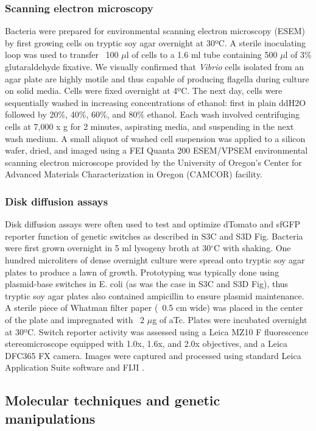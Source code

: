 \subsubsection{Scanning electron microscopy} 
Bacteria were prepared for environmental scanning electron microscopy (ESEM) by first growing cells on tryptic soy agar overnight at 30ºC. A sterile inoculating loop was used to transfer ~100 $\mu$l of cells to a 1.6 ml tube containing 500 $\mu$l of 3\% glutaraldehyde fixative. We visually confirmed that \textit{Vibrio} cells isolated from an agar plate are highly motile and thus capable of producing flagella during culture on solid media. Cells were fixed overnight at 4ºC. The next day, cells were sequentially washed in increasing concentrations of ethanol: first in plain ddH2O followed by 20\%, 40\%, 60\%, and 80\% ethanol. Each wash involved centrifuging cells at 7,000 x g for 2 minutes, aspirating media, and suspending in the next wash medium. A small aliquot of washed cell suspension was applied to a silicon wafer, dried, and imaged using a FEI Quanta 200 ESEM/VPSEM environmental scanning electron microscope provided by the University of Oregon's Center for Advanced Materials Characterization in Oregon (CAMCOR) facility. 

\subsubsection{Disk diffusion assays}
Disk diffusion assays were often used to test and optimize dTomato and sfGFP reporter function of genetic switches as described in S3C and S3D Fig. Bacteria were first grown overnight in 5 ml lysogeny broth at 30$^\circ$C with shaking. One hundred microliters of dense overnight culture were spread onto tryptic soy agar plates to produce a lawn of growth. Prototyping was typically done using plasmid-base switches in E. coli (as was the case in S3C and S3D Fig), thus tryptic soy agar plates also contained ampicillin to ensure plasmid maintenance. A sterile piece of Whatman filter paper (~0.5 cm wide) was placed in the center of the plate and impregnated with ~2 $\mu$g of aTc. Plates were incubated overnight at 30ºC. Switch reporter activity was assessed using a Leica MZ10 F fluorescence stereomicroscope equipped with 1.0x, 1.6x, and 2.0x objectives, and a Leica DFC365 FX camera. Images were captured and processed using standard Leica Application Suite software and FIJI \cite{schindelin_fiji_2012}.   

\subsection{Molecular techniques and genetic manipulations}

